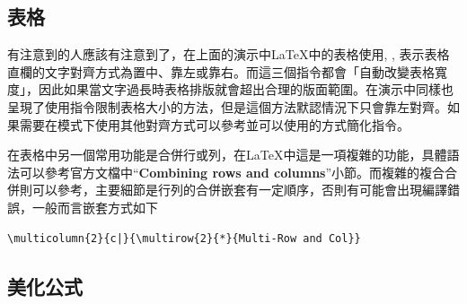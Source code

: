 \documentclass[12pt]{report}
\theoremstyle{plain}
\begin{document}
\subsection{表格}

有注意到的人應該有注意到了，在上面的演示中\LaTeX 中的表格使用, , 表示表格直欄的文字對齊方式為置中、靠左或靠右。而這三個指令都會「自動改變表格寬度」，因此如果當文字過長時表格排版就會超出合理的版面範圍。在演示中同樣也呈現了使用指令限制表格大小的方法，但是這個方法默認情況下只會靠左對齊。如果需要在模式下使用其他對齊方式可以參考\cite{latextabp}並可以使用\cite{latexntab}的方式簡化指令。

在表格中另一個常用功能是合併行或列，在\LaTeX 中這是一項複雜的功能，具體語法可以參考官方文檔\cite{latextabmul}中``\textbf{Combining rows and columns}''小節。而複雜的複合合併則可以參考\cite{latextabcomplex}，主要細節是行列的合併嵌套有一定順序，否則有可能會出現編譯錯誤，一般而言嵌套方式如下
\begin{lstlisting}
\multicolumn{2}{c|}{\multirow{2}{*}{Multi-Row and Col}}
\end{lstlisting}

\subsection{美化公式}
\end{document}

